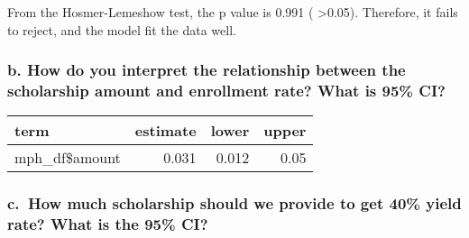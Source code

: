 \documentclass[
]{article}
\newenvironment{Shaded}{\begin{snugshade}}{\end{snugshade}}
\newcommand{\DataTypeTok}[1]{\textcolor[rgb]{0.13,0.29,0.53}{#1}}
\newcommand{\DecValTok}[1]{\textcolor[rgb]{0.00,0.00,0.81}{#1}}
\newcommand{\FloatTok}[1]{\textcolor[rgb]{0.00,0.00,0.81}{#1}}
\newcommand{\KeywordTok}[1]{\textcolor[rgb]{0.13,0.29,0.53}{\textbf{#1}}}
\newcommand{\NormalTok}[1]{#1}
\newcommand{\OperatorTok}[1]{\textcolor[rgb]{0.81,0.36,0.00}{\textbf{#1}}}
\newcommand{\StringTok}[1]{\textcolor[rgb]{0.31,0.60,0.02}{#1}}
\begin{document}
From the Hosmer-Lemeshow test, the p value is 0.991 ( \textgreater0.05).
Therefore, it fails to reject, and the model fit the data well.

\hypertarget{b.-how-do-you-interpret-the-relationship-between-the-scholarship-amount-and-enrollment-rate-what-is-95-ci}{%
\subsubsection{b. How do you interpret the relationship between the
scholarship amount and enrollment rate? What is 95\%
CI?}\label{b.-how-do-you-interpret-the-relationship-between-the-scholarship-amount-and-enrollment-rate-what-is-95-ci}}

\begin{Shaded}
\end{Shaded}

\begin{longtable}[]{@{}lrrr@{}}
\toprule
term & estimate & lower & upper\tabularnewline
\midrule
\endhead
mph\_df\$amount & 0.031 & 0.012 & 0.05\tabularnewline
\bottomrule
\end{longtable}

\hypertarget{c.-how-much-scholarship-should-we-provide-to-get-40-yield-rate-what-is-the-95-ci}{%
\subsubsection{c.~How much scholarship should we provide to get 40\%
yield rate? What is the 95\%
CI?}\label{c.-how-much-scholarship-should-we-provide-to-get-40-yield-rate-what-is-the-95-ci}}
\end{document}
